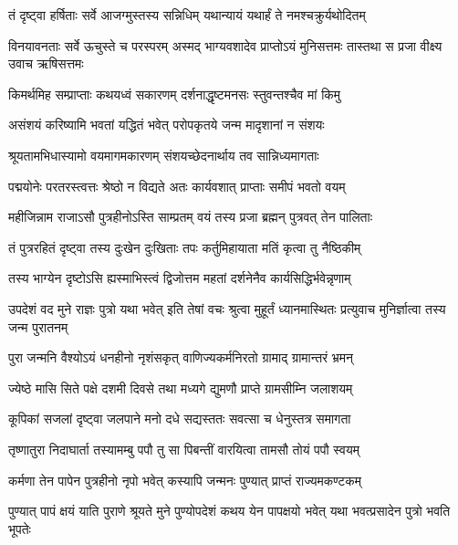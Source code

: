 \twolineshloka
{तं दृष्ट्वा हर्षिताः सर्वे आजग्मुस्तस्य सन्निधिम्}
{यथान्यायं यथार्हं ते नमश्चक्रुर्यथोदितम्}%

\threelineshloka
{विनयावनताः सर्वे ऊचुस्ते च परस्परम्}
{अस्मद् भाग्यवशादेव प्राप्तोऽयं मुनिसत्तमः}
{तास्तथा स प्रजा वीक्ष्य उवाच ऋषिसत्तमः}%


\twolineshloka
{किमर्थमिह सम्प्राप्ताः कथयध्वं सकारणम्}
{दर्शनाद्धृष्टमनसः स्तुवन्तश्चैव मां किमु}%

\twolineshloka
{असंशयं करिष्यामि भवतां यद्धितं भवेत्}
{परोपकृतये जन्म मादृशानां न संशयः}%


\twolineshloka
{श्रूयतामभिधास्यामो वयमागमकारणम्}
{संशयच्छेदनार्थाय तव सान्निध्यमागताः}%

\twolineshloka
{पद्मयोनेः परतरस्त्वत्तः श्रेष्ठो न विद्यते}
{अतः कार्यवशात् प्राप्ताः समीपं भवतो वयम्}%

\twolineshloka
{महीजिन्नाम राजाऽसौ पुत्रहीनोऽस्ति साम्प्रतम्}
{वयं तस्य प्रजा ब्रह्मन् पुत्रवत् तेन पालिताः}%

\twolineshloka
{तं पुत्ररहितं दृष्ट्वा तस्य दुःखेन दुःखिताः}
{तपः कर्तुमिहायाता मतिं कृत्वा तु नैष्ठिकीम्}%

\twolineshloka
{तस्य भाग्येन दृष्टोऽसि ह्यस्माभिस्त्वं द्विजोत्तम}
{महतां दर्शनेनैव कार्यसिद्धिर्भवेन्नृणाम्}%

\threelineshloka
{उपदेशं वद मुने राज्ञः पुत्रो यथा भवेत्}
{इति तेषां वचः श्रुत्वा मुहूर्तं ध्यानमास्थितः}
{प्रत्युवाच मुनिर्ज्ञात्वा तस्य जन्म पुरातनम्}%


\twolineshloka
{पुरा जन्मनि वैश्योऽयं धनहीनो नृशंसकृत्}
{वाणिज्यकर्मनिरतो ग्रामाद् ग्रामान्तरं भ्रमन्}%

\twolineshloka
{ज्येष्ठे मासि सिते पक्षे दशमी दिवसे तथा}
{मध्यगे द्युमणौ प्राप्ते ग्रामसीम्नि जलाशयम्}%

\twolineshloka
{कूपिकां सजलां दृष्ट्वा जलपाने मनो दधे}
{सद्यस्ततः सवत्सा च धेनुस्तत्र समागता}%

\twolineshloka
{तृष्णातुरा निदाघार्ता तस्यामम्बु पपौ तु सा}
{पिबन्तीं वारयित्वा तामसौ तोयं पपौ स्वयम्}%

\twolineshloka
{कर्मणा तेन पापेन पुत्रहीनो नृपो भवेत्}
{कस्यापि जन्मनः पुण्यात् प्राप्तं राज्यमकण्टकम्}%


\threelineshloka
{पुण्यात् पापं क्षयं याति पुराणे श्रूयते मुने}
{पुण्योपदेशं कथय येन पापक्षयो भवेत्}
{यथा भवत्प्रसादेन पुत्रो भवति भूपतेः}%

